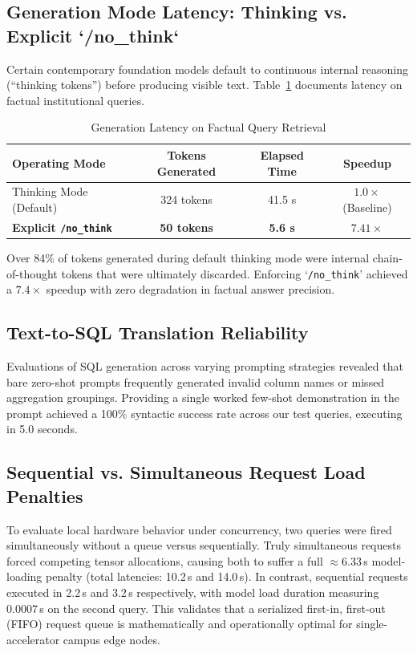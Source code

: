\documentclass[conference]{IEEEtran}
\begin{document}
\subsection{Generation Mode Latency: Thinking vs. Explicit `/no\_think`}
Certain contemporary foundation models default to continuous internal reasoning (``thinking tokens'') before producing visible text. Table~\ref{tab:thinking_mode} documents latency on factual institutional queries.

\begin{table}[htbp]
\centering
\caption{Generation Latency on Factual Query Retrieval}
\label{tab:thinking_mode}
\begin{tabular}{@{}lccc@{}}
\toprule
\textbf{Operating Mode} & \textbf{Tokens Generated} & \textbf{Elapsed Time} & \textbf{Speedup} \\
\midrule
Thinking Mode (Default) & 324 tokens & 41.5 s & $1.0\times$ (Baseline) \\
\textbf{Explicit \texttt{/no\_think}} & \textbf{50 tokens} & \textbf{5.6 s} & $\mathbf{7.41\times}$ \\
\bottomrule
\end{tabular}
\end{table}

Over 84\% of tokens generated during default thinking mode were internal chain-of-thought tokens that were ultimately discarded. Enforcing `\texttt{/no\_think}' achieved a $7.4\times$ speedup with zero degradation in factual answer precision.

\subsection{Text-to-SQL Translation Reliability}
Evaluations of SQL generation across varying prompting strategies revealed that bare zero-shot prompts frequently generated invalid column names or missed aggregation groupings. Providing a single worked few-shot demonstration in the prompt achieved a 100\% syntactic success rate across our test queries, executing in 5.0 seconds.

\subsection{Sequential vs. Simultaneous Request Load Penalties}
To evaluate local hardware behavior under concurrency, two queries were fired simultaneously without a queue versus sequentially. Truly simultaneous requests forced competing tensor allocations, causing both to suffer a full $\approx 6.33$\,s model-loading penalty (total latencies: 10.2\,s and 14.0\,s). In contrast, sequential requests executed in 2.2\,s and 3.2\,s respectively, with model load duration measuring $0.0007$\,s on the second query. This validates that a serialized first-in, first-out (FIFO) request queue is mathematically and operationally optimal for single-accelerator campus edge nodes.
\end{document}
